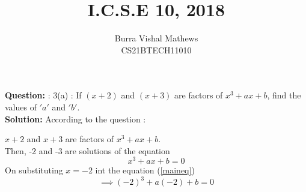 \documentclass[journal,12pt,twocolumn]{IEEEtran}
\begin{document}



\providecommand{\pr}[1]{\ensuremath{\Pr\left(#1\right)}}
\providecommand{\qfunc}[1]{\ensuremath{Q\left(#1\right)}}
\providecommand{\sbrak}[1]{\ensuremath{{}\left[#1\right]}}
\providecommand{\lsbrak}[1]{\ensuremath{{}\left[#1\right.}}
\providecommand{\rsbrak}[1]{\ensuremath{{}\left.#1\right]}}
\providecommand{\brak}[1]{\ensuremath{\left(#1\right)}}
\providecommand{\lbrak}[1]{\ensuremath{\left(#1\right.}}
\providecommand{\rbrak}[1]{\ensuremath{\left.#1\right)}}
\providecommand{\cbrak}[1]{\ensuremath{\left\{#1\right\}}}
\providecommand{\lcbrak}[1]{\ensuremath{\left\{#1\right.}}
\providecommand{\rcbrak}[1]{\ensuremath{\left.#1\right\}}}
\theoremstyle{remark}
\newtheorem{rem}{Remark}
\newcommand{\sgn}{\mathop{\mathrm{sgn}}}

\providecommand{\system}{\overset{\mathcal{H}}{ \longleftrightarrow}}
\newcommand{\question}{\noindent \textbf{Question: }}	
\newcommand{\solution}{\noindent \textbf{Solution: }}

\providecommand{\dec}[2]{\ensuremath{\overset{#1}{\underset{#2}{\gtrless}}}}

\let\vec\mathbf

\newcommand{\myvec}[1]{\ensuremath{\begin{pmatrix}#1\end{pmatrix}}}
\newcommand{\mydet}[1]{\ensuremath{\begin{vmatrix}#1\end{vmatrix}}}

\vspace{3cm}
\title{I.C.S.E 10, 2018}

\author{ Burra Vishal Mathews\\CS21BTECH11010}
	


\maketitle
\question : 3(a) : 
 If $(x+2)$ and $(x+3)$ are factors of $x^3+ax+b$, find the values of $'a'$ and $'b'$.\\


\solution
    According to the question :

    $x+2$ and $x+3$ are factors of $x^3+ax+b$.\\
    Then, -2 and -3 are solutions of the equation \\
    \begin{equation}
    \label{maineq}
        x^3+ax+b=0
    \end{equation}
    On substituting $x=-2$  int the equation (\ref{maineq})
        $$\implies \brak{-2}^3+a\brak{-2}+b=0$$ 
\end{document}
